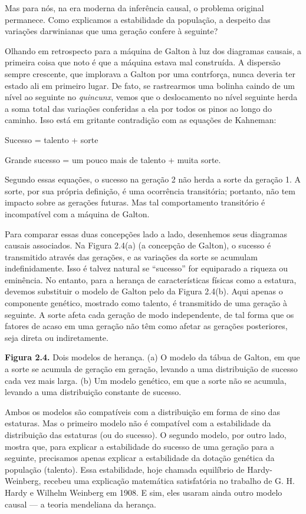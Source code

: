 \documentclass[11pt,a5paper,twoside]{book}
\begin{document}
Mas para nós, na era moderna da inferência causal, o problema original permanece. Como explicamos a estabilidade da população, a despeito das variações darwinianas que uma geração confere à seguinte?

Olhando em retrospecto para a máquina de Galton à luz dos diagramas causais, a primeira coisa que noto é que a máquina estava mal construída. A dispersão sempre crescente, que implorava a Galton por uma contrforça, nunca deveria ter estado ali em primeiro lugar. De fato, se rastrearmos uma bolinha caindo de um nível ao seguinte no \textit{quincunx}, vemos que o deslocamento no nível seguinte herda a soma total das variações conferidas a ela por todos os pinos ao longo do caminho. Isso está em gritante contradição com as equações de Kahneman:

Sucesso = talento + sorte

Grande sucesso = um pouco mais de talento + muita sorte.

Segundo essas equações, o sucesso na geração 2 não herda a sorte da geração 1. A sorte, por sua própria definição, é uma ocorrência transitória; portanto, não tem impacto sobre as gerações futuras. Mas tal comportamento transitório é incompatível com a máquina de Galton.

Para comparar essas duas concepções lado a lado, desenhemos seus diagramas causais associados. Na Figura 2.4(a) (a concepção de Galton), o sucesso é transmitido através das gerações, e as variações da sorte se acumulam indefinidamente. Isso é talvez natural se “sucesso” for equiparado a riqueza ou eminência. No entanto, para a herança de características físicas como a estatura, devemos substituir o modelo de Galton pelo da Figura 2.4(b). Aqui apenas o componente genético, mostrado como talento, é transmitido de uma geração à seguinte. A sorte afeta cada geração de modo independente, de tal forma que os fatores de acaso em uma geração não têm como afetar as gerações posteriores, seja direta ou indiretamente.

\textbf{Figura 2.4.} Dois modelos de herança. (a) O modelo da tábua de Galton, em que a sorte se acumula de geração em geração, levando a uma distribuição de sucesso cada vez mais larga. (b) Um modelo genético, em que a sorte não se acumula, levando a uma distribuição constante de sucesso.

Ambos os modelos são compatíveis com a distribuição em forma de sino das estaturas. Mas o primeiro modelo não é compatível com a estabilidade da distribuição das estaturas (ou do sucesso). O segundo modelo, por outro lado, mostra que, para explicar a estabilidade do sucesso de uma geração para a seguinte, precisamos apenas explicar a estabilidade da dotação genética da população (talento). Essa estabilidade, hoje chamada equilíbrio de Hardy-Weinberg, recebeu uma explicação matemática satisfatória no trabalho de G. H. Hardy e Wilhelm Weinberg em 1908. E sim, eles usaram ainda outro modelo causal — a teoria mendeliana da herança.
\end{document}
